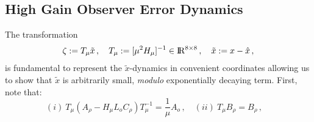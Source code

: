 \documentclass[letterpaper, 10 pt, conference]{ieeeconf}  %
\def\re{{\rm I}\! {\rm R}}
\theoremstyle{plain}
\theoremstyle{definition}
\theoremstyle{remark}
\begin{document}
\subsection{High Gain Observer Error Dynamics}

The transformation \cite{OK:97}
%
\begin{equation}
\zeta:=T_{\mu}\tilde{x}\,, \quad T_\mu:=[\mu^2
H_\mu]^{-1} \in \re^{8 \times 8}\,, \quad \tilde{x}:= x-\hat{x}\,,\label{eq:defT_HGO}
\end{equation}
%
is fundamental to represent the $\tilde{x}$-dynamics in 
convenient coordinates allowing us to show that $\tilde{x}$ is
arbitrarily small, {\em modulo} exponentially decaying term. First,
note that:
%
$$(i) \ T_\mu(A_\rho-H_\mu L_o
C_\rho)T_\mu^{-1}\!=\!\frac{1}{\mu}A_o\,, \quad (ii) \ T_\mu B_\rho\!=\!B_\rho\,, \quad$$ 
\end{document}
